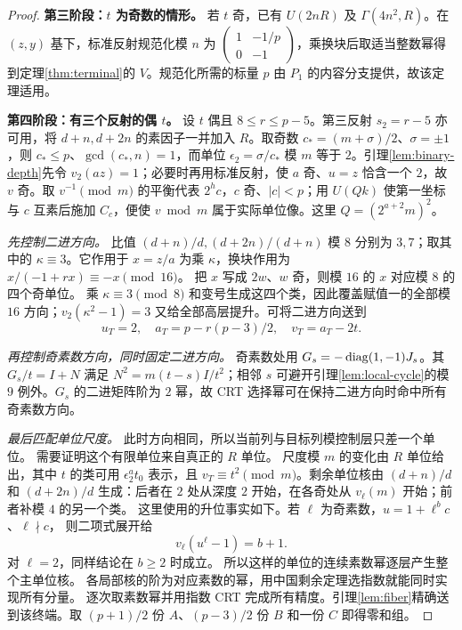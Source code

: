 \begin{proof}
\par\noindent\textbf{第三阶段：$t$ 为奇数的情形。}
若 $t$ 奇，已有 $U(2nR)$ 及 $\Gamma(4n^2,R)$。在 $(z,y)$ 基下，标准反射规范化模 $n$ 为 $\left(\begin{smallmatrix}1&-1/p\\0&-1\end{smallmatrix}\right)$，乘换块后取适当整数幂得到定理\ref{thm:terminal}的 $V$。规范化所需的标量 $p$ 由 $P_1$ 的内容分支提供，故该定理适用。


\par\noindent\textbf{第四阶段：有三个反射的偶 $t$。}
设 $t$ 偶且 $8\le r\le p-5$。第三反射 $s_2=r-5$ 亦可用，将 $d+n,d+2n$ 的素因子一并加入 $R$。取奇数 $c_*=(m+\sigma)/2$、$\sigma=\pm1$，则 $c_*\le p$、$\gcd(c_*,n)=1$，而单位 $\epsilon_2=\sigma/c_*$ 模 $m$ 等于 $2$。引理\ref{lem:binary-depth}先令 $v_2(az)=1$；必要时再用标准反射，使 $a$ 奇、$u=z$ 恰含一个 $2$，故 $v$ 奇。取 $v^{-1}\pmod m$ 的平衡代表 $2^h c$，$c$ 奇、$|c|<p$；用 $U(Qk)$ 使第一坐标与 $c$ 互素后施加 $C_c$，便使 $v\bmod m$ 属于实际单位像。这里 $Q=(2^{a+2}m)^2$。

\par\noindent\emph{先控制二进方向。}
比值 $(d+n)/d,(d+2n)/(d+n)$ 模 $8$ 分别为 $3,7$；取其中的 $\kappa\equiv3$。它作用于 $x=z/a$ 为乘 $\kappa$，换块作用为 $x/(-1+rx)\equiv-x\pmod{16}$。
把 $x$ 写成 $2w$、$w$ 奇，则模 $16$ 的 $x$ 对应模 $8$ 的四个奇单位。
乘 $\kappa\equiv3\pmod8$ 和变号生成这四个类，因此覆盖赋值一的全部模 $16$ 方向；$v_2(\kappa^2-1)=3$ 又给全部高层提升。可将二进方向送到
\[
u_T=2,\quad a_T=p-r(p-3)/2,\quad v_T=a_T-2t.
\]

\par\noindent\emph{再控制奇素数方向，同时固定二进方向。}
奇素数处用 $G_s=-\operatorname{diag}(1,-1)J_s$。其 $G_s/t=I+N$ 满足 $N^2=m(t-s)I/t^2$；相邻 $s$ 可避开引理\ref{lem:local-cycle}的模 $9$ 例外。$G_s$ 的二进矩阵阶为 $2$ 幂，故 CRT 选择幂可在保持二进方向时命中所有奇素数方向。

\par\noindent\emph{最后匹配单位尺度。}
此时方向相同，所以当前列与目标列模控制层只差一个单位。
需要证明这个有限单位来自真正的 $R$ 单位。
尺度模 $m$ 的变化由 $R$ 单位给出，其中 $t$ 的类可用 $\epsilon_2^a t_0$ 表示，且 $v_T\equiv t^2\pmod m$。剩余单位核由 $(d+n)/d$ 和 $(d+2n)/d$ 生成：后者在 $2$ 处从深度 $2$ 开始，在各奇处从 $v_\ell(m)$ 开始；前者补模 $4$ 的另一个类。
这里使用的升位事实如下。若 $\ell$ 为奇素数，$u=1+\ell^b c$、$\ell\nmid c$，
则二项式展开给
\[
v_\ell(u^\ell-1)=b+1.
\]
对 $\ell=2$，同样结论在 $b\ge2$ 时成立。
所以这样的单位的连续素数幂逐层产生整个主单位核。
各局部核的阶为对应素数的幂，用中国剩余定理选指数就能同时实现所有分量。
逐次取素数幂并用指数 CRT 完成所有精度。引理\ref{lem:fiber}精确送到该终端。取 $(p+1)/2$ 份 $A$、$(p-3)/2$ 份 $B$ 和一份 $C$ 即得零和组。



\end{proof}
